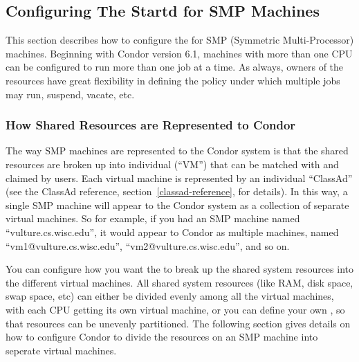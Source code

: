 \subsection{\label{sec:Configuring-SMP}
Configuring The Startd for SMP Machines}

This section describes how to configure the  for SMP
(Symmetric Multi-Processor) machines.
Beginning with Condor version 6.1, machines with more than one CPU can
be configured to run more than one job at a time.
As always, owners of the resources have great flexibility in defining
the policy under which multiple jobs may run, suspend, vacate, etc.  

\subsubsection{\label{sec:How-Resources-Represented}
How Shared Resources are Represented to Condor}

The way SMP machines are represented to the Condor system is that
the shared resources are broken up into individual  (``VM'') that can be matched with and claimed by users.
Each virtual machine is represented by an individual ``ClassAd''
(see the ClassAd reference, section~\ref{classad-reference}, for
details). 
In this way, a single SMP machine will appear to the Condor system as
a collection of separate virtual machines.  
So for example, if you had an SMP machine named
``vulture.cs.wisc.edu'', it would appear to Condor as multiple
machines, named ``vm1@vulture.cs.wisc.edu'',
``vm2@vulture.cs.wisc.edu'', and so on.

You can configure how you want the  to break up the
shared system resources into the different virtual machines.  
All shared system resources (like RAM, disk space, swap space, etc)
can either be divided evenly among all the virtual machines, with each
CPU getting its own virtual machine, or you can define your own
, so that resources can be unevenly
partitioned.
The following section gives details on how to configure Condor to
divide the resources on an SMP machine into seperate virtual machines.


